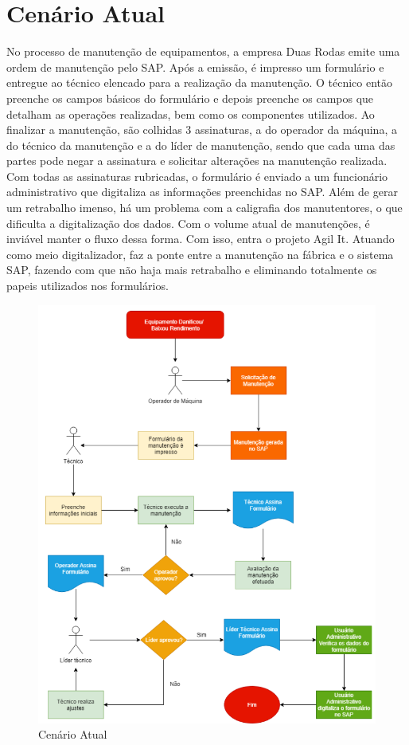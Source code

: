 {\section{Cenário Atual}
No processo de manutenção de equipamentos, a empresa Duas Rodas emite uma ordem de manutenção pelo SAP. Após a emissão, é impresso um formulário e entregue ao técnico elencado para a realização da manutenção. O técnico então preenche os campos básicos do formulário e depois preenche os campos que detalham as operações realizadas, bem como os componentes utilizados. Ao finalizar a manutenção, são colhidas 3 assinaturas, a do operador da máquina, a do técnico da manutenção e a do líder de manutenção, sendo que cada uma das partes pode negar a assinatura e solicitar alterações na manutenção realizada. Com todas as assinaturas rubricadas, o formulário é enviado a um funcionário administrativo que digitaliza as informações preenchidas no SAP. Além de gerar um retrabalho imenso, há um problema com a caligrafia dos manutentores, o que dificulta a digitalização dos dados. Com o volume atual de manutenções, é inviável manter o fluxo dessa forma. Com isso, entra o projeto Agil It. Atuando como meio digitalizador, faz a ponte entre a manutenção na fábrica e o sistema SAP, fazendo com que não haja mais retrabalho e eliminando totalmente os papeis utilizados nos formulários.
\newpage
\begin{figure}[htb]
	\caption{\label{cenario_atual1}Cenário Atual}
	\begin{center}
		\includegraphics[scale=0.55]{./Figuras/cenario-atual1.png}
	\end{center}
\end{figure}
}
